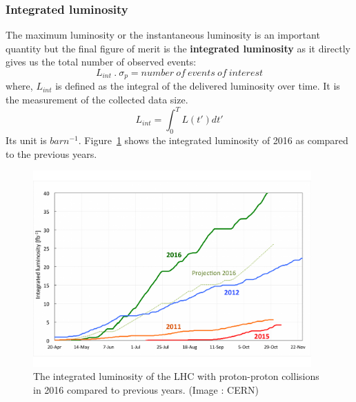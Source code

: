 \subsubsection{Integrated luminosity} %
\label{ssub:integrated_luminosity}
The maximum luminosity or the instantaneous luminosity is an important quantity but the final figure of merit is the \textbf{integrated luminosity} as it directly gives us the total number of observed events:
\begin{equation}
	L_{int}~.~\sigma_p = number~of~events~of~interest
\end{equation}
where, $L_{int}$ is defined as the integral of the delivered luminosity over time. It is the measurement of the collected data size.
\begin{equation}
	L_{int} = \int_0^T L(t')dt'
\end{equation}
Its unit is $barn^{-1}$. Figure~\ref{fig:lumi-proj-2016-final-v2} shows the integrated luminosity of 2016 as compared to the previous years.
\begin{figure}[!htbp]
	\centering
	\includegraphics[width=0.95\textwidth]{figures/lumi-proj-2016-final-v2}
	\caption{The integrated luminosity of the LHC with proton-proton collisions in 2016 compared to previous years. (Image : CERN)}
	\label{fig:lumi-proj-2016-final-v2}
\end{figure}





